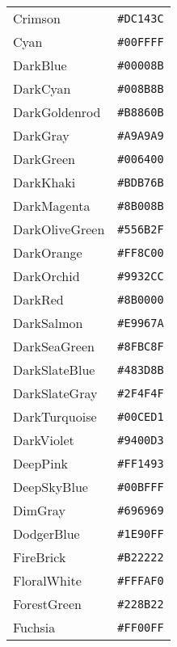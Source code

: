 \documentclass[a4paper]{article}
\begin{document}
\begin{longtable}{|l|r|}
Crimson & \texttt{\#DC143C} \cellcolor[HTML]{DC143C} \\
Cyan & \texttt{\#00FFFF} \cellcolor[HTML]{00FFFF} \\
DarkBlue & \texttt{\#00008B} \cellcolor[HTML]{00008B} \\
DarkCyan & \texttt{\#008B8B} \cellcolor[HTML]{008B8B} \\
DarkGoldenrod & \texttt{\#B8860B} \cellcolor[HTML]{B8860B} \\
DarkGray & \texttt{\#A9A9A9} \cellcolor[HTML]{A9A9A9} \\
DarkGreen & \texttt{\#006400} \cellcolor[HTML]{006400} \\
DarkKhaki & \texttt{\#BDB76B} \cellcolor[HTML]{BDB76B} \\
DarkMagenta & \texttt{\#8B008B} \cellcolor[HTML]{8B008B} \\
DarkOliveGreen & \texttt{\#556B2F} \cellcolor[HTML]{556B2F} \\
DarkOrange & \texttt{\#FF8C00} \cellcolor[HTML]{FF8C00} \\
DarkOrchid & \texttt{\#9932CC} \cellcolor[HTML]{9932CC} \\
DarkRed & \texttt{\#8B0000} \cellcolor[HTML]{8B0000} \\
DarkSalmon & \texttt{\#E9967A} \cellcolor[HTML]{E9967A} \\
DarkSeaGreen & \texttt{\#8FBC8F} \cellcolor[HTML]{8FBC8F} \\
DarkSlateBlue & \texttt{\#483D8B} \cellcolor[HTML]{483D8B} \\
DarkSlateGray & \texttt{\#2F4F4F} \cellcolor[HTML]{2F4F4F} \\
DarkTurquoise & \texttt{\#00CED1} \cellcolor[HTML]{00CED1} \\
DarkViolet & \texttt{\#9400D3} \cellcolor[HTML]{9400D3} \\
DeepPink & \texttt{\#FF1493} \cellcolor[HTML]{FF1493} \\
DeepSkyBlue & \texttt{\#00BFFF} \cellcolor[HTML]{00BFFF} \\
DimGray & \texttt{\#696969} \cellcolor[HTML]{696969} \\
DodgerBlue & \texttt{\#1E90FF} \cellcolor[HTML]{1E90FF} \\
FireBrick & \texttt{\#B22222} \cellcolor[HTML]{B22222} \\
FloralWhite & \texttt{\#FFFAF0} \cellcolor[HTML]{FFFAF0} \\
ForestGreen & \texttt{\#228B22} \cellcolor[HTML]{228B22} \\
Fuchsia & \texttt{\#FF00FF} \cellcolor[HTML]{FF00FF} \\

\end{longtable}
\end{document}
